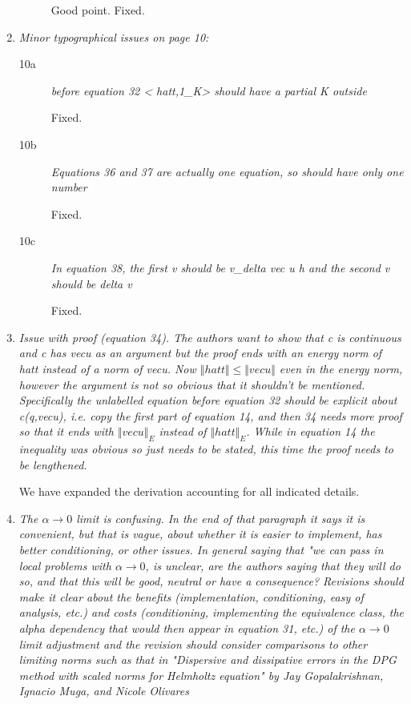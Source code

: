 \documentclass[11pt,c]{article}
\begin{document}
\begin{enumerate}
\begin{description}
Good point. Fixed.
\end{description}

  \item {\em Minor typographical issues on page 10:}
\begin{description}
  \item[10a] {\em  before equation 32 < hat{t},1\_K> should have a partial K outside}

Fixed.

  \item[10b] {\em  Equations 36 and 37 are actually one equation, so should have only one number}

Fixed.

  \item[10c]{\em  In equation 38, the first v should be v\_delta vec u h and the second v should be delta v}

Fixed.
\end{description}

  \item {\em Issue with proof (equation 34).  The authors want to show that c is continuous and c has vec{u} as an argument but the proof ends with an energy norm of hat{t} instead of a norm of vec{u}.  Now $\Vert hat{t}\Vert  \leq \Vert vec{u}\Vert$  even in the energy norm, however the argument is not so obvious that it shouldn't be mentioned.  Specifically the unlabelled equation before equation 32 should be explicit about c(q,vec{u}), i.e. copy the first part of equation 14, and then 34 needs more proof so that it ends with $\Vert vec u\Vert_E$ instead of $\Vert  hat t \Vert_E$.  While in equation 14 the inequality was obvious so just needs to be stated, this time the proof needs to be lengthened.}

We have expanded the derivation accounting for all indicated details.


  \item {\em The $\alpha \to 0$ limit is confusing.  In the end of that paragraph it says it is convenient, but that is vague, about whether it is easier to implement, has better conditioning, or other issues.  In general saying that "we can pass in local problems with 
$\alpha \to 0$, is unclear, are the authors saying that they will do so, and that this will be good, neutral or have a consequence?  Revisions should make it clear about the benefits (implementation, conditioning, easy of analysis, etc.) and costs (conditioning, implementing the equivalence class, the alpha dependency that would then appear in equation 31, etc.) of the 
$\alpha \to 0$ limit adjustment and the revision should consider comparisons to other limiting norms such as that in "Dispersive and dissipative errors in the DPG method with scaled norms for Helmholtz equation" by Jay Gopalakrishnan, Ignacio Muga, and Nicole Olivares}


\end{enumerate}
\end{document}
